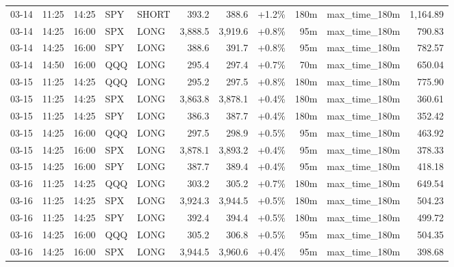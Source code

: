 \documentclass[11pt,a4paper,twoside]{article}
\begin{document}
\begin{center}
\begin{longtable}{>{\color{txtmain}}l l l l l r r r r >{\color{txtmain}}l r}
03-14 & 11:25 & 14:25 & SPY & SHORT & 393.2 & 388.6 & \textcolor{wingreen}{+1.2\%} & 180m & max\_time\_180m & \textcolor{wingreen}{1,164.89} \\
03-14 & 14:25 & 16:00 & SPX & LONG & 3,888.5 & 3,919.6 & \textcolor{wingreen}{+0.8\%} & 95m & max\_time\_180m & \textcolor{wingreen}{790.83} \\
03-14 & 14:25 & 16:00 & SPY & LONG & 388.6 & 391.7 & \textcolor{wingreen}{+0.8\%} & 95m & max\_time\_180m & \textcolor{wingreen}{782.57} \\
03-14 & 14:50 & 16:00 & QQQ & LONG & 295.4 & 297.4 & \textcolor{wingreen}{+0.7\%} & 70m & max\_time\_180m & \textcolor{wingreen}{650.04} \\
03-15 & 11:25 & 14:25 & QQQ & LONG & 295.2 & 297.5 & \textcolor{wingreen}{+0.8\%} & 180m & max\_time\_180m & \textcolor{wingreen}{775.90} \\
03-15 & 11:25 & 14:25 & SPX & LONG & 3,863.8 & 3,878.1 & \textcolor{wingreen}{+0.4\%} & 180m & max\_time\_180m & \textcolor{wingreen}{360.61} \\
03-15 & 11:25 & 14:25 & SPY & LONG & 386.3 & 387.7 & \textcolor{wingreen}{+0.4\%} & 180m & max\_time\_180m & \textcolor{wingreen}{352.42} \\
03-15 & 14:25 & 16:00 & QQQ & LONG & 297.5 & 298.9 & \textcolor{wingreen}{+0.5\%} & 95m & max\_time\_180m & \textcolor{wingreen}{463.92} \\
03-15 & 14:25 & 16:00 & SPX & LONG & 3,878.1 & 3,893.2 & \textcolor{wingreen}{+0.4\%} & 95m & max\_time\_180m & \textcolor{wingreen}{378.33} \\
03-15 & 14:25 & 16:00 & SPY & LONG & 387.7 & 389.4 & \textcolor{wingreen}{+0.4\%} & 95m & max\_time\_180m & \textcolor{wingreen}{418.18} \\
03-16 & 11:25 & 14:25 & QQQ & LONG & 303.2 & 305.2 & \textcolor{wingreen}{+0.7\%} & 180m & max\_time\_180m & \textcolor{wingreen}{649.54} \\
03-16 & 11:25 & 14:25 & SPX & LONG & 3,924.3 & 3,944.5 & \textcolor{wingreen}{+0.5\%} & 180m & max\_time\_180m & \textcolor{wingreen}{504.23} \\
03-16 & 11:25 & 14:25 & SPY & LONG & 392.4 & 394.4 & \textcolor{wingreen}{+0.5\%} & 180m & max\_time\_180m & \textcolor{wingreen}{499.72} \\
03-16 & 14:25 & 16:00 & QQQ & LONG & 305.2 & 306.8 & \textcolor{wingreen}{+0.5\%} & 95m & max\_time\_180m & \textcolor{wingreen}{504.35} \\
03-16 & 14:25 & 16:00 & SPX & LONG & 3,944.5 & 3,960.6 & \textcolor{wingreen}{+0.4\%} & 95m & max\_time\_180m & \textcolor{wingreen}{398.68} \\

\end{longtable}
\end{center}
\end{document}
